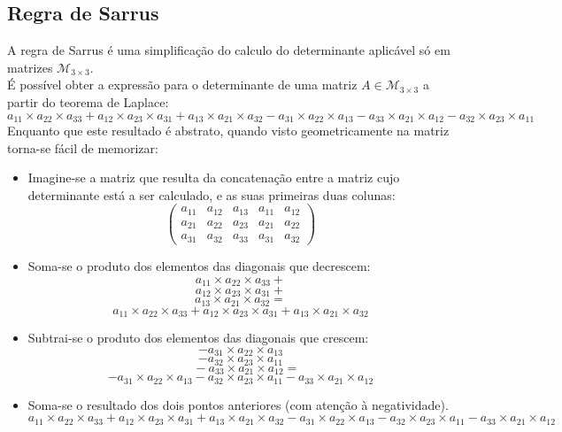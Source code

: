 \documentclass[]{report}
\begin{document}
\subsection{Regra de Sarrus}
\begin{minipage}{\textwidth}
A regra de Sarrus é uma simplificação do calculo do determinante aplicável só em matrizes $\mathcal{M}_{3\times 3}$.\\
É possível obter a expressão para o determinante de uma matriz $A \in \mathcal{M}_{3 \times 3}$ a partir do teorema de Laplace:
$$a_{11} \times a_{22} \times a_{33} + a_{12} \times a_{23} \times a_{31} + a_{13} \times a_{21} \times a_{32}
 - a_{31} \times a_{22} \times a_{13} - a_{33} \times a_{21} \times a_{12} - a_{32} \times a_{23} \times a_{11}$$
Enquanto que este resultado é abstrato, quando visto geometricamente na matriz torna-se fácil de memorizar:
\begin{itemize}
\item Imagine-se a matriz que resulta da concatenação entre a matriz cujo determinante está a ser calculado, e as suas primeiras duas colunas:
$$
\left(\begin{array}{ccc|cc}
  a_{11} & a_{12} & a_{13} & a_{11} & a_{12} \\
  a_{21} & a_{22} & a_{23} & a_{21} & a_{22} \\
  a_{31} & a_{32} & a_{33} & a_{31} & a_{32}
\end{array}\right)
$$
\item Soma-se o produto dos elementos das diagonais que decrescem:
$$a_{11} \times a_{22} \times a_{33} +$$
$$a_{12} \times a_{23} \times a_{31} +$$
$$a_{13} \times a_{21} \times a_{32} =$$
$$a_{11} \times a_{22} \times a_{33} + a_{12} \times a_{23} \times a_{31} + a_{13} \times a_{21} \times a_{32}$$
\item Subtrai-se o produto dos elementos das diagonais que crescem:
$$- a_{31} \times a_{22} \times a_{13}$$
$$- a_{32} \times a_{23} \times a_{11}$$
$$\quad- a_{33} \times a_{21} \times a_{12}=$$
$$- a_{31} \times a_{22} \times a_{13} - a_{32} \times a_{23} \times a_{11} - a_{33} \times a_{21} \times a_{12}$$
\item Soma-se o resultado dos dois pontos anteriores (com atenção à negatividade).
$$a_{11} \times a_{22} \times a_{33} + a_{12} \times a_{23} \times a_{31} + a_{13} \times a_{21} \times a_{32} - a_{31} \times a_{22} \times a_{13} - a_{32} \times a_{23} \times a_{11} - a_{33} \times a_{21} \times a_{12}$$
\end{itemize}
\begin{center}

\end{center}
\end{minipage}
\end{document}
